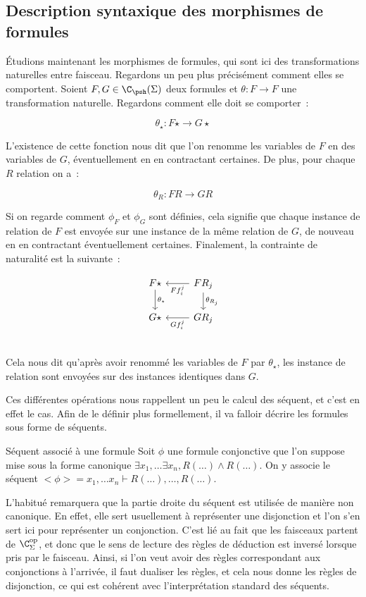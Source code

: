 
\subsection{Description syntaxique des morphismes de formules}

Étudions maintenant les morphismes de formules, qui sont ici des transformations
naturelles entre faisceau. Regardons un peu plus précisément comment elles se
comportent. Soient $F,G\in\C_\psh(\Sigma)$ deux formules et $\theta:F\rightarrow F$
une transformation naturelle. Regardons comment elle doit se comporter~:

\[ \theta_\star : F\star \rightarrow G\star \]

L'existence de cette fonction nous dit que l'on renomme les variables de $F$ en des
variables de $G$, éventuellement en en contractant certaines. De plus, pour chaque
$R$ relation on a~:

\[ \theta_R : FR\rightarrow GR\]

Si on regarde comment $\phi_F$ et $\phi_G$ sont définies, cela signifie que chaque
instance de relation de $F$ est envoyée sur une instance de la même relation de $G$,
de nouveau en en contractant éventuellement certaines. Finalement, la contrainte
de naturalité est la suivante~:

\[\begin{tikzcd}
    F\star \arrow[d, "\theta_\star"] & FR_j \arrow[l, "Ff_i^j"]
                                            \arrow[d, "\theta_{R_j}"] \\
    G\star & GR_j \arrow[l, "Gf_i^j"] \\
\end{tikzcd}\]

Cela nous dit qu'après avoir renommé les variables de $F$ par $\theta_\star$, les
instance de relation sont envoyées sur des instances identiques dans $G$.

Ces différentes opérations nous rappellent un peu le calcul des séquent, et
c'est en effet le cas. Afin de le définir plus formellement, il va falloir décrire
les formules sous forme de séquents.

\begin{defi}{Séquent associé à une formule}
    Soit $\phi$ une formule conjonctive que l'on suppose mise sous la
    forme canonique $\exists x_1,\dots\exists x_n, R(\dots)\wedge R(\dots)$. On
    y associe le séquent $<\phi> = x_1,\dots x_n\vdash R(\dots), \dots, R(\dots)$.
\end{defi}

\begin{rem}
    L'habitué remarquera que la partie droite du séquent est utilisée de manière non
    canonique. En effet, elle sert usuellement à représenter une disjonction et
    l'on s'en sert ici pour représenter un conjonction. C'est lié au fait que
    les faisceaux partent de $\C_\Sigma^\text{op}$, et donc que le sens de lecture
    des règles de déduction est inversé lorsque pris par le faisceau. Ainsi, si l'on
    veut avoir des règles correspondant aux conjonctions à l'arrivée, il faut dualiser
    les règles, et cela nous donne les règles de disjonction, ce qui est cohérent avec
    l'interprétation standard des séquents.
\end{rem}

